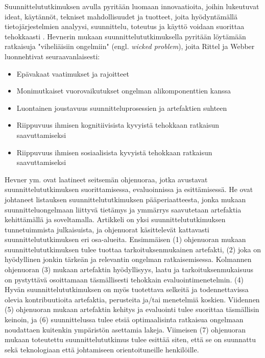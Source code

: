 \documentclass[utf8]{gradu3}
\begin{document}
Suunnittelututkimuksen avulla pyritään luomaan innovaatioita, joihin lukeutuvat ideat, käytännöt, tekniset mahdollisuudet ja tuotteet, joita hyödyntämällä tietojärjestelmien analyysi, suunnittelu, toteutus ja käyttö voidaan suorittaa tehokkaasti \parencite{hevner2004}. Hevnerin mukaan \parencite*{hevner2004} suunnittelututkimuksella pyritään löytämään ratkaisuja "viheliäisiin ongelmiin" (engl. \textit{wicked problem}), joita Rittel ja Webber \parencite*{wicked} luonnehtivat seuraavanlaisesti: 

\begin{itemize}
  \item Epävakaat vaatimukset ja rajoitteet
  \item Monimutkaiset vuorovaikutukset ongelman alikomponenttien kanssa
  \item Luontainen joustavuus suunnitteluprosessien ja artefaktien suhteen
  \item Riippuvuus ihmisen kognitiivisista kyvyistä tehokkaan ratkaisun saavuttamiseksi
  \item Riippuvuus ihmisen sosiaalisista kyvyistä tehokkaan ratkaisun saavuttamiseksi
\end{itemize}

Hevner ym. \parencite*{hevner2004} ovat laatineet seitsemän ohjenuoraa, jotka avustavat suunnittelututkimuksen suorittamisessa, evaluoinnissa ja esittämisessä.  He ovat johtaneet listauksen suunnittelututkimuksen pääperiaatteesta, jonka mukaan suunnitteluongelmaan liittyvä tietämys ja ymmärrys saavutetaan artefaktia kehittämällä ja soveltamalla. Artikkeli on yksi suunnittelututkimuksen tunnetuimmista julkaisuista, ja ohjenuorat käsittelevät kattavasti suunnittelututkimuksen eri osa-alueita.  Ensimmäisen (1) ohjenuoran mukaan suunnittelututkimuksen tulee tuottaa tarkoituksenmukainen artefakti, (2) joka on hyödyllinen jonkin tärkeän ja relevantin ongelman ratkaisemisessa. Kolmannen ohjenuoran (3) mukaan artefaktin hyödyllisyys, laatu ja tarkoituksenmukaisuus on pystyttävä osoittamaan täsmällisesti tehokkain evaluointimenetelmin. (4) Hyvän suunnittelututkimuksen on myös tuotettava selkeitä ja todennettavissa olevia kontribuutioita artefaktia, perusteita ja/tai menetelmiä koskien. Viidennen (5) ohjenuoran mukaan artefaktin kehitys ja evaluointi tulee suorittaa täsmällisin keinoin, ja (6) suunnittelussa tulee etsiä optimaalisinta ratkaisua ongelmaan noudattaen kuitenkin ympäristön asettamia lakeja. Viimeisen (7) ohjenuoran mukaan toteutettu suunnittelututkimus tulee esittää siten, että se on suunnattu sekä teknologiaan että johtamiseen orientoituneille henkilöille.
\end{document}
